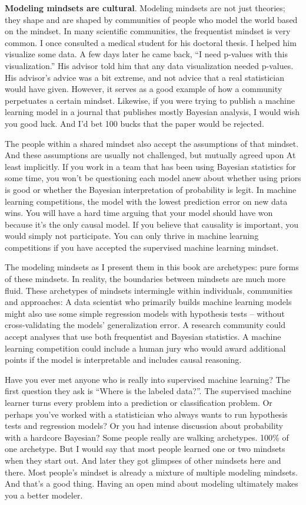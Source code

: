 \documentclass[
  10pt,
]{scrbook}
\begin{document}
\textbf{Modeling mindsets are cultural}.
Modeling mindsets are not just theories; they shape and are shaped by communities of people who model the world based on the mindset.
In many scientific communities, the frequentist mindset is very common.
I once consulted a medical student for his doctoral thesis.
I helped him visualize some data.
A few days later he came back, ``I need p-values with this visualization.''
His advisor told him that any data visualization needed p-values.
His advisor's advice was a bit extreme, and not advice that a real statistician would have given.
However, it serves as a good example of how a community perpetuates a certain mindset.
Likewise, if you were trying to publish a machine learning model in a journal that publishes mostly Bayesian analysis, I would wish you good luck.
And I'd bet 100 bucks that the paper would be rejected.

The people within a shared mindset also accept the assumptions of that mindset.
And these assumptions are usually not challenged, but mutually agreed upon
At least implicitly.
If you work in a team that has been using Bayesian statistics for some time, you won't be questioning each model anew about whether using priors is good or whether the Bayesian interpretation of probability is legit.
In machine learning competitions, the model with the lowest prediction error on new data wins.
You will have a hard time arguing that your model should have won because it's the only causal model.
If you believe that causality is important, you would simply not participate.
You can only thrive in machine learning competitions if you have accepted the supervised machine learning mindset.

The modeling mindsets as I present them in this book are archetypes: pure forms of these mindsets.
In reality, the boundaries between mindsets are much more fluid.
These archetypes of mindsets intermingle within individuals, communities and approaches:
A data scientist who primarily builds machine learning models might also use some simple regression models with hypothesis tests -- without cross-validating the models' generalization error.
A research community could accept analyses that use both frequentist and Bayesian statistics.
A machine learning competition could include a human jury who would award additional points if the model is interpretable and includes causal reasoning.

Have you ever met anyone who is really into supervised machine learning?
The first question they ask is ``Where is the labeled data?''.
The supervised machine learner turns every problem into a prediction or classification problem.
Or perhaps you've worked with a statistician who always wants to run hypothesis tests and regression models?
Or you had intense discussion about probability with a hardcore Bayesian?
Some people really are walking archetypes. 100\% of one archetype.
But I would say that most people learned one or two mindsets when they start out.
And later they got glimpses of other mindsets here and there.
Most people's mindset is already a mixture of multiple modeling mindsets.
And that's a good thing.
Having an open mind about modeling ultimately makes you a better modeler.
\end{document}
